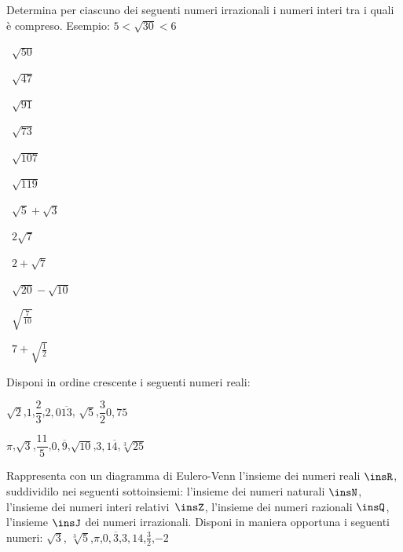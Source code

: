 \begin{esercizio}
\label{ese:1.4}
 Determina per ciascuno dei seguenti numeri irrazionali i numeri interi tra 
i quali è compreso. Esempio: $5<\sqrt{30}<6$
\begin{multicols}{4}
\begin{enumeratea}
 \item~$\sqrt{50}$
 \item~$\sqrt{47}$
 \item~$\sqrt{91}$
 \item~$\sqrt{73}$
 \item~$\sqrt{107}$
 \item~$\sqrt{119}$
 \item~$\sqrt 5+\sqrt 3$
 \item~$2\sqrt 7$
 \item~$2+\sqrt 7$
 \item~$\sqrt{20}-\sqrt{10}$
 \item~$\sqrt{\frac 7{10}}$
 \item~$7+\sqrt{\frac 1 2}$
\end{enumeratea}
\end{multicols}
\end{esercizio}

\begin{esercizio}
\label{ese:1.5}
 Disponi in ordine crescente i seguenti numeri reali:
 \begin{enumeratea}
 \item $\sqrt 2$,\quad $1$,\quad $\dfrac 2 3$,\quad $2,0\overline{13}$,\quad 
$\sqrt 5$,\quad $\dfrac 3 2$\quad $0,75$
 \item $\pi$,\quad $\sqrt 3$,\quad $\dfrac{11} 5$,\quad $0,\overline 
9$,\quad $\sqrt{10}$,\quad $3,1\overline 4$,\quad $\sqrt[3]{25}$
 \end{enumeratea}
\end{esercizio}

\begin{esercizio}
\label{ese:1.6}
 Rappresenta con un diagramma di Eulero-Venn l'insieme dei numeri reali 
$\insR$, suddividilo nei seguenti sottoinsiemi: l'insieme dei numeri 
naturali $\insN$, l'insieme dei numeri interi relativi~$\insZ$, l'insieme 
dei numeri razionali $\insQ$, l'insieme $\insJ$ dei numeri irrazionali. 
Disponi in maniera opportuna i seguenti numeri: $\sqrt 3$,\quad 
$\sqrt[3]5$,\quad$\pi$,\quad $0,\overline 3$,\quad $3,14$,\quad $\frac 3 
2$,\quad$-2$
\end{esercizio}


